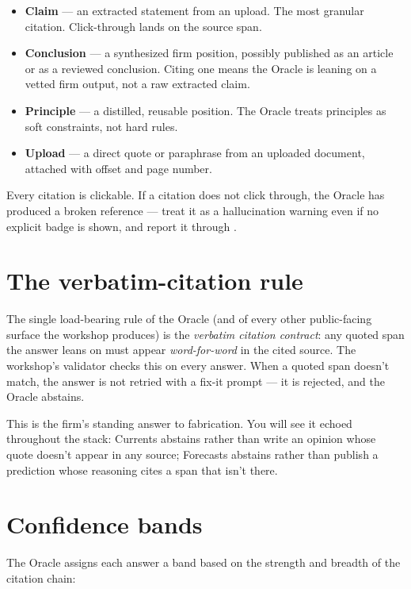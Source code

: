 \documentclass[11pt]{article}
\begin{document}
\begin{itemize}[leftmargin=*,itemsep=0.2em]
  \item \textbf{Claim} --- an extracted statement from an upload. The
        most granular citation. Click-through lands on the source
        span.
  \item \textbf{Conclusion} --- a synthesized firm position, possibly
        published as an article or as a reviewed conclusion. Citing
        one means the Oracle is leaning on a vetted firm output, not
        a raw extracted claim.
  \item \textbf{Principle} --- a distilled, reusable position. The
        Oracle treats principles as soft constraints, not hard rules.
  \item \textbf{Upload} --- a direct quote or paraphrase from an
        uploaded document, attached with offset and page number.
\end{itemize}

Every citation is clickable. If a citation does not click through,
the Oracle has produced a broken reference --- treat it as a
hallucination warning even if no explicit badge is shown, and report
it through .

\section{The verbatim-citation rule}

The single load-bearing rule of the Oracle (and of every other
public-facing surface the workshop produces) is the \emph{verbatim
citation contract}: any quoted span the answer leans on must appear
\emph{word-for-word} in the cited source. The workshop's validator
checks this on every answer. When a quoted span doesn't match, the
answer is not retried with a fix-it prompt --- it is rejected, and
the Oracle abstains.

This is the firm's standing answer to fabrication. You will see it
echoed throughout the stack: Currents abstains rather than write an
opinion whose quote doesn't appear in any source; Forecasts abstains
rather than publish a prediction whose reasoning cites a span that
isn't there.

\section{Confidence bands}

The Oracle assigns each answer a band based on the strength and
breadth of the citation chain:
\end{document}
